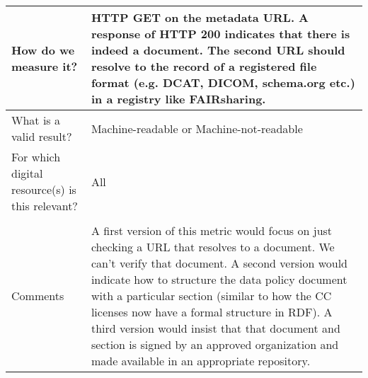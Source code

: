 \documentclass[english]{article}
\begin{document}
\begin{longtable}{|p{5cm}|p{9cm}|}
\hline
How do we measure it? &  
HTTP GET on the metadata URL. A response of HTTP 200 indicates that there is indeed a document. The second URL should resolve to the record of a registered file format (e.g. DCAT, DICOM, schema.org etc.) in a registry like FAIRsharing. \newline
\\



\hline
What is a valid result? &  

Machine-readable or Machine-not-readable

\\



\hline
For which digital resource(s) is this relevant? &  All\\



\hline

\\



\hline

Comments & 

A first version of this metric would focus on just checking a URL that resolves to a document. We can’t verify that document. \newline
A second version would indicate how to structure the data policy document with a particular section (similar to how the CC licenses now have a formal structure in RDF).\newline
A third version would insist that that document and section is signed by an approved organization and made available in an appropriate repository. \\ 
\hline
\end{longtable}


\newpage
\end{document}
